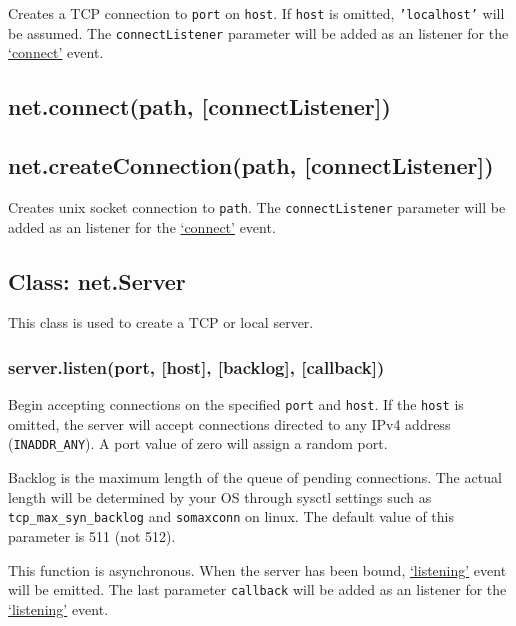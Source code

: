 Creates a TCP connection to \texttt{port} on \texttt{host}. If
\texttt{host} is omitted, \texttt{'localhost'} will be assumed. The
\texttt{connectListener} parameter will be added as an listener for the
\hyperref[netux5feventux5fconnect]{`connect'} event.

\subsection{net.connect(path,
{[}connectListener{]})}\label{net.connectpath-connectlistener}

\subsection{net.createConnection(path,
{[}connectListener{]})}\label{net.createconnectionpath-connectlistener}

Creates unix socket connection to \texttt{path}. The
\texttt{connectListener} parameter will be added as an listener for the
\hyperref[netux5feventux5fconnect]{`connect'} event.

\subsection{Class: net.Server}\label{class-net.server}

This class is used to create a TCP or local server.

\subsubsection{server.listen(port, {[}host{]}, {[}backlog{]},
{[}callback{]})}\label{server.listenport-host-backlog-callback}

Begin accepting connections on the specified \texttt{port} and
\texttt{host}. If the \texttt{host} is omitted, the server will accept
connections directed to any IPv4 address (\texttt{INADDR\_ANY}). A port
value of zero will assign a random port.

Backlog is the maximum length of the queue of pending connections. The
actual length will be determined by your OS through sysctl settings such
as \texttt{tcp\_max\_syn\_backlog} and \texttt{somaxconn} on linux. The
default value of this parameter is 511 (not 512).

This function is asynchronous. When the server has been bound,
\hyperref[netux5feventux5flistening]{`listening'} event will be emitted.
The last parameter \texttt{callback} will be added as an listener for
the \hyperref[netux5feventux5flistening]{`listening'} event.

